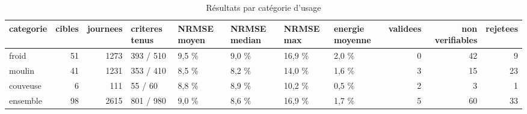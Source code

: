 \begin{table}[htbp]
\caption{Résultats par catégorie d'usage}
\label{tab:resultats_par_categorie}
\begin{tabular}{lrrlllllrrr}
\toprule
categorie & cibles & journees & criteres tenus & NRMSE moyen & NRMSE median & NRMSE max & energie moyenne & validees & non verifiables & rejetees \\
\midrule
froid & 51 & 1273 & 393 / 510 & 9,5 \% & 9,0 \% & 16,9 \% & 2,0 \% & 0 & 42 & 9 \\
moulin & 41 & 1231 & 353 / 410 & 8,5 \% & 8,2 \% & 14,0 \% & 1,6 \% & 3 & 15 & 23 \\
couveuse & 6 & 111 & 55 / 60 & 8,8 \% & 8,9 \% & 10,2 \% & 0,5 \% & 2 & 3 & 1 \\
ensemble & 98 & 2615 & 801 / 980 & 9,0 \% & 8,6 \% & 16,9 \% & 1,7 \% & 5 & 60 & 33 \\
\bottomrule
\end{tabular}
\end{table}
